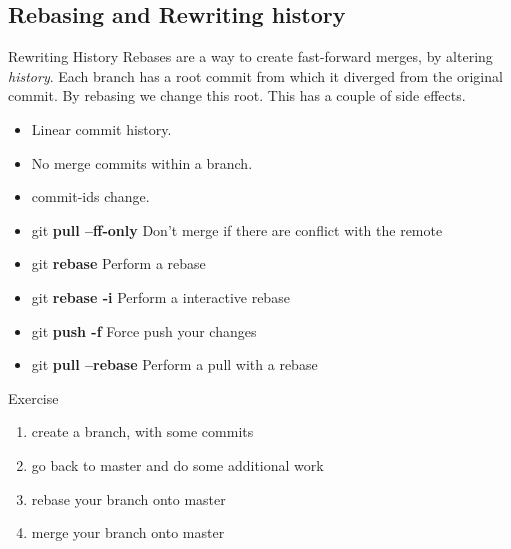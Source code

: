 \documentclass{beamer}
\begin{document}
\subsection{Rebasing and Rewriting history}
\begin{frame}[fragile]{Rewriting History}
  Rebases are a way to create fast-forward merges, by altering \emph{history}. Each branch has a root commit from which it diverged from the original commit. By rebasing we change this root. This has a couple of side effects. 
  \begin{itemize}
    \item Linear commit history.
    \item No merge commits within a branch.
    \item commit-ids change.
  \end{itemize}

  \begin{block}{}
    \begin{itemize}
      \item git \textbf{pull --ff-only} Don't merge if there are conflict with the remote
      \item git \textbf{rebase} Perform a rebase
      \item git \textbf{rebase -i} Perform a interactive rebase
      \item git \textbf{push -f} Force push your changes
      \item git \textbf{pull --rebase} Perform a pull with a rebase
    \end{itemize}
  \end{block}
\end{frame}

\begin{frame}
  \begin{block}{Exercise}
    \begin{enumerate}
      \item create a branch, with some commits
      \item go back to master and do some additional work
      \item rebase your branch onto master
      \item merge your branch onto master
    \end{enumerate}
  \end{block}
\end{frame}
\end{document}

